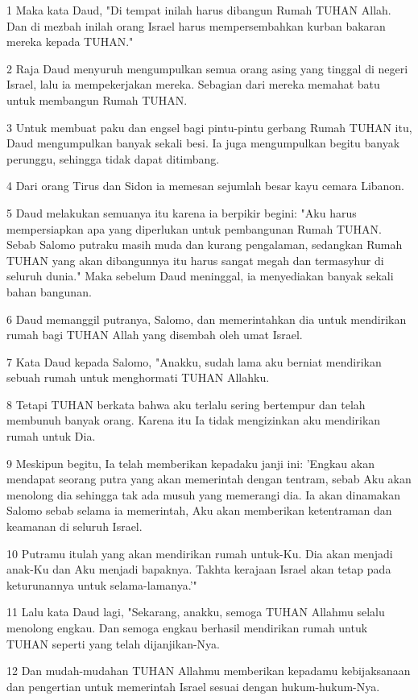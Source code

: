 \par 1 Maka kata Daud, "Di tempat inilah harus dibangun Rumah TUHAN Allah. Dan di mezbah inilah orang Israel harus mempersembahkan kurban bakaran mereka kepada TUHAN."
\par 2 Raja Daud menyuruh mengumpulkan semua orang asing yang tinggal di negeri Israel, lalu ia mempekerjakan mereka. Sebagian dari mereka memahat batu untuk membangun Rumah TUHAN.
\par 3 Untuk membuat paku dan engsel bagi pintu-pintu gerbang Rumah TUHAN itu, Daud mengumpulkan banyak sekali besi. Ia juga mengumpulkan begitu banyak perunggu, sehingga tidak dapat ditimbang.
\par 4 Dari orang Tirus dan Sidon ia memesan sejumlah besar kayu cemara Libanon.
\par 5 Daud melakukan semuanya itu karena ia berpikir begini: "Aku harus mempersiapkan apa yang diperlukan untuk pembangunan Rumah TUHAN. Sebab Salomo putraku masih muda dan kurang pengalaman, sedangkan Rumah TUHAN yang akan dibangunnya itu harus sangat megah dan termasyhur di seluruh dunia." Maka sebelum Daud meninggal, ia menyediakan banyak sekali bahan bangunan.
\par 6 Daud memanggil putranya, Salomo, dan memerintahkan dia untuk mendirikan rumah bagi TUHAN Allah yang disembah oleh umat Israel.
\par 7 Kata Daud kepada Salomo, "Anakku, sudah lama aku berniat mendirikan sebuah rumah untuk menghormati TUHAN Allahku.
\par 8 Tetapi TUHAN berkata bahwa aku terlalu sering bertempur dan telah membunuh banyak orang. Karena itu Ia tidak mengizinkan aku mendirikan rumah untuk Dia.
\par 9 Meskipun begitu, Ia telah memberikan kepadaku janji ini: 'Engkau akan mendapat seorang putra yang akan memerintah dengan tentram, sebab Aku akan menolong dia sehingga tak ada musuh yang memerangi dia. Ia akan dinamakan Salomo sebab selama ia memerintah, Aku akan memberikan ketentraman dan keamanan di seluruh Israel.
\par 10 Putramu itulah yang akan mendirikan rumah untuk-Ku. Dia akan menjadi anak-Ku dan Aku menjadi bapaknya. Takhta kerajaan Israel akan tetap pada keturunannya untuk selama-lamanya.'"
\par 11 Lalu kata Daud lagi, "Sekarang, anakku, semoga TUHAN Allahmu selalu menolong engkau. Dan semoga engkau berhasil mendirikan rumah untuk TUHAN seperti yang telah dijanjikan-Nya.
\par 12 Dan mudah-mudahan TUHAN Allahmu memberikan kepadamu kebijaksanaan dan pengertian untuk memerintah Israel sesuai dengan hukum-hukum-Nya.
